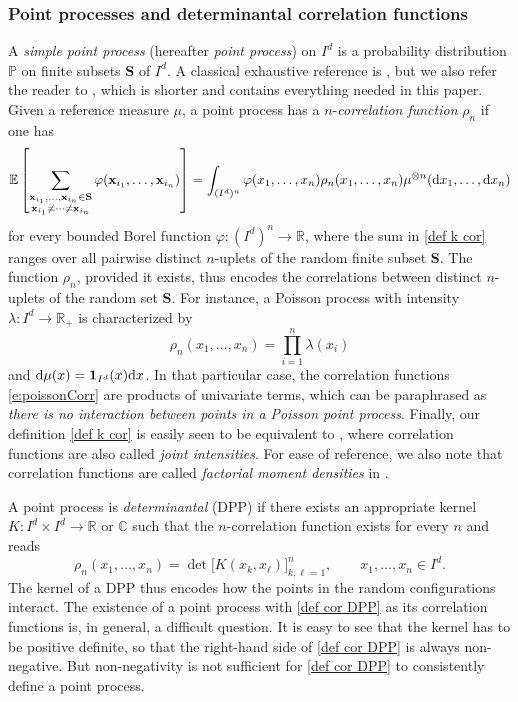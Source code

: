 \documentclass[a4paper,11pt]{article}
\numberwithin{equation}{section}
\theoremstyle{definition}
\newcommand{\rev}[1]{#1}
\newcommand{\eq}{\begin{equation}}
\newcommand{\qe}{\end{equation}}
\newcommand{\R}{\mathbb{R}}
\newcommand{\C}{\mathbb{C}}
\renewcommand{\P}{\mathbb{P}}
\newcommand{\bs}{\boldsymbol}
\newcommand{\bv}{\mathbf}
\renewcommand{\phi}{\varphi}
\renewcommand{\d}{ {\rm d}}
\begin{document}
\label{sec intro MOPE}
\subsubsection{Point processes and determinantal correlation functions}

A \textit{simple point process} (hereafter \emph{point process}) on $I^d$ is a
probability distribution $\P$ on  finite subsets $\bv S$ of $I^d$. A classical exhaustive reference is \citep{DaVe03}, but we also refer the reader to \citep{HKPV06}, which is shorter and contains everything needed in this paper. Given a reference measure $\mu$, a point process has a $n$-\textit{correlation function} $\rho_n$ if one has
\eq
\label{def k cor}
\mathbb E\left[\sum_{ \substack{ \rev{ \bv x_{i_1}, \ldots, \bv x_{i_n}\in\bv S}\\
\bv x_{i_1}\neq \cdots\neq \bv x_{i_n} }}
\phi( \bv x_{i_1}, \ldots, \bv x_{i_n})\right]=\int_{(I^d)^n}\phi(x_1,\ldots,x_n)\rho_n(x_1,\ldots,x_n)\mu^{\otimes n}(\d x_1,\ldots,\d x_n)
\qe
for every bounded Borel function $\phi:(I^d)^n\to\R$, where the sum in \eqref{def k
  cor} ranges over all pairwise distinct $n$-uplets of the random  finite subset $\bv S$. The function $\rho_n$, provided it exists, thus encodes the correlations between distinct $n$-uplets  of the random  set $\bv S$. For instance, \rev{a Poisson process with intensity $\lambda:I^d\rightarrow \mathbb{R}_+$ is characterized by
  \eq
  \rho_n(x_1,\dots,x_n) = \prod_{i=1}^n \lambda(x_i)
  \label{e:poissonCorr}
  \qe
   and $\d \mu(x) = \bs{1}_{I^d}(x)\d x$. In that particular case, the correlation functions \eqref{e:poissonCorr} are products of univariate terms, which can be paraphrased as \emph{there is no interaction between points in a Poisson point process}. Finally, our definition \eqref{def k cor} is easily seen to be equivalent to \cite[Definition 1]{HKPV06}, where correlation functions are also called \emph{joint intensities}. For ease of reference, we also note that correlation functions are called \emph{factorial moment densities} in \cite[Section 5.4]{DaVe03}}.

A point process is \textit{determinantal} (DPP) if there exists an appropriate kernel $K:I^d\times I^d\to\R$ \rev{or $\C$} such that the $n$-correlation function exists for every $n$ and reads
\eq
\label{def cor DPP}
\rho_n(x_1,\ldots,x_n)=\det\Big[K(x_k,x_\ell)\Big]_{k,\ell=1}^n,\qquad x_1,\ldots,x_n\in I^d.
\qe
\rev{The kernel of a DPP thus encodes how the points in the random configurations interact. The existence of a point process with \eqref{def cor DPP} as its correlation functions is, in general, a difficult question. It is easy to see that the kernel has to be positive definite, so that the right-hand side of \eqref{def cor DPP} is always non-negative. But non-negativity is not sufficient for \eqref{def cor DPP} to consistently define a point process.}
\end{document}

